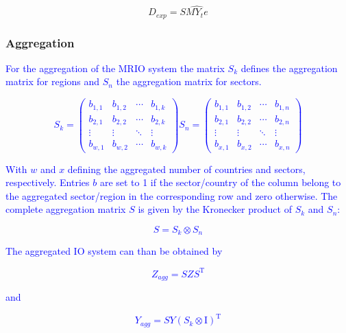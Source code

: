 \documentclass{jors}
\begin{document}
{\begin{equation}
    D_{exp} = S\widehat{MY_{t}e}
\end{equation}


\subsubsection*{Aggregation}
\textcolor{blue}{
For the aggregation of the MRIO system the matrix $S_k$ defines
the aggregation matrix for regions and $S_n$ the aggregation matrix
for sectors.

\begin{equation}
    S_k =
    \begin{pmatrix}
      b_{1,1} & b_{1,2} & \cdots & b_{1,k} \\
      b_{2,1} & b_{2,2} & \cdots & b_{2,k} \\
      \vdots  & \vdots  & \ddots & \vdots  \\
      b_{w,1} & b_{w,2} & \cdots & b_{w,k}
    \end{pmatrix}
    S_n =
    \begin{pmatrix}
      b_{1,1} & b_{1,2} & \cdots & b_{1,n} \\
      b_{2,1} & b_{2,2} & \cdots & b_{2,n} \\
      \vdots  & \vdots  & \ddots & \vdots  \\
      b_{x,1} & b_{x,2} & \cdots & b_{x,n}
    \end{pmatrix}
\end{equation}

With $w$ and $x$ defining the aggregated number of countries and sectors,
respectively. Entries $b$ are set to 1 if the sector/country of the column
belong to the aggregated sector/region in the corresponding row and zero
otherwise. The complete aggregation matrix $S$ is given by the Kronecker
product of $S_k$ and $S_n$:

\begin{equation}
    S = S_k \otimes S_n
\end{equation}

The aggregated IO system can than be obtained by

\begin{equation}
    Z_{agg} = SZS^\mathrm{T} 
\end{equation}

and

\begin{equation}
    Y_{agg} = SY(S_k \otimes \mathrm{I})^\mathrm{T}
\end{equation}

}}
\end{document}
